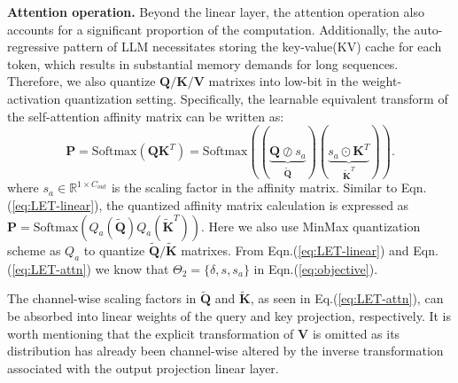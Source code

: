 \documentclass{article} %
\begin{document}
\textbf{Attention operation.} Beyond the linear layer, the attention operation also accounts for a significant proportion of the computation. Additionally, the auto-regressive pattern of LLM necessitates storing the key-value(KV) cache for each token, which results in substantial memory demands for long sequences. Therefore, we also quantize $\mathbf{Q}/\mathbf{K}/\mathbf{V}$ matrixes into low-bit in the weight-activation quantization setting. Specifically, the learnable equivalent transform of the self-attention affinity matrix can be written as:
\begin{equation}\label{eq:LET-attn}
    \mathbf{P} =\mathrm{Softmax} (\mathbf{Q} \mathbf{K} ^{T})=\mathrm{Softmax} ((\underbrace{\mathbf{Q}\oslash s_a}_{\tilde{\mathbf{Q}}}) (\underbrace{s_a\odot\mathbf{K} ^{T}}_{\tilde{\mathbf{K}}^T})).
\end{equation}
where $s_a\in \mathbb{R}^{1\times C_{out}}$ is the scaling factor in the affinity matrix. Similar to Eqn.(\ref{eq:LET-linear}), the quantized affinity matrix calculation is expressed as $\mathbf{P} = \mathrm{Softmax} (Q_a (\widetilde{\mathbf{Q}}) Q_a (\widetilde{\mathbf{K}}^{T}))$. Here we also use MinMax quantization scheme as $Q_a$ to quantize $\tilde{\mathbf{Q}}/\tilde{\mathbf{K}}$ matrixes. From Eqn.(\ref{eq:LET-linear}) and Eqn.(\ref{eq:LET-attn}) we know that $\Theta_2=\{\delta,s,s_a\}$ in Eqn.(\ref{eq:objective}).

The channel-wise scaling factors in $\tilde{\mathbf{Q}}$ and $\tilde{\mathbf{K}}$, as seen in Eq.(\ref{eq:LET-attn}), can be absorbed into linear weights of the query and key projection, respectively. 
%
It is worth mentioning that the explicit transformation of $\mathbf{V}$ is omitted as its distribution has already been channel-wise altered by the inverse transformation associated with the output projection linear layer.
\end{document}
